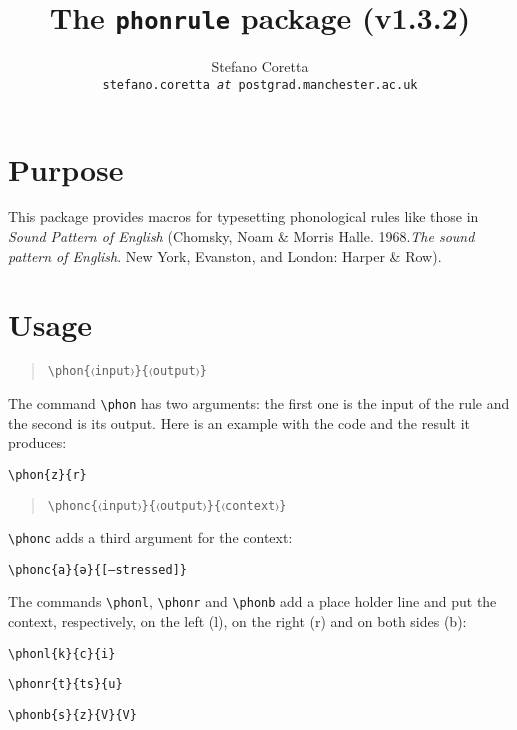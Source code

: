\documentclass[a4paper]{article}
\title{The \texttt{phonrule} package (v1.3.2)}
\author{Stefano Coretta \\ \texttt{stefano.coretta \textit{at} postgrad.manchester.ac.uk}}
\begin{document}
\maketitle

\section{Purpose}
This package provides macros for typesetting phonological rules like those in \textit{Sound Pattern of English} (Chomsky, Noam \& Morris Halle. 1968.\textit{The sound pattern of English}. New York, Evanston, and London: Harper \& Row).

\section{Usage}

\begin{quote}
\begin{lstlisting}
\phon{〈input〉}{〈output〉}
\end{lstlisting}
\end{quote}

The command \verb+\phon+ has two arguments: the first one is the input of the rule and the second is its output.
Here is an example with the code and the result it produces:

\begin{exe}
\ex \verb+\phon{z}{r}+
\ex {}
\end{exe}

\begin{quote}
\begin{lstlisting}
\phonc{〈input〉}{〈output〉}{〈context〉}
\end{lstlisting}
\end{quote}

\verb+\phonc+ adds a third argument for the context:

\begin{exe}
\ex \verb+\phonc{a}{ə}{[–stressed]}+
\ex {}
\end{exe}

The commands \verb+\phonl+, \verb+\phonr+ and \verb+\phonb+ add a place holder line and put the context, respectively, on the left (l), on the right (r) and on both sides (b):

\begin{exe}
\ex
    \begin{xlist}
    \ex \verb+\phonl{k}{c}{i}+
    \ex {}
    \end{xlist}
\ex
    \begin{xlist}
    \ex \verb+\phonr{t}{ts}{u}+
    \ex {}
    \end{xlist}
\ex
    \begin{xlist}
    \ex \verb+\phonb{s}{z}{V}{V}+
    \ex {}
    \end{xlist}
\end{exe}
\end{document}
